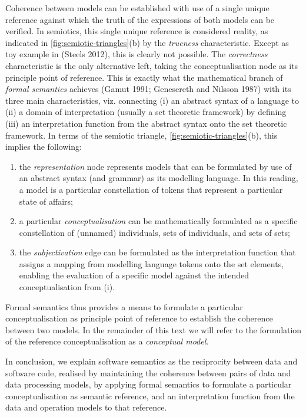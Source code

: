 \documentclass[a4paper,11pt,oneside,oldfontcommands]{memoir}
\theoremstyle{definition}
\theoremstyle{break}		%
\numberwithin{equation}{chapter}
\numberwithin{figure}{chapter}
\begin{document}
Coherence between models can be established with use of a single unique
reference against which the truth of the expressions of both models can
be verified. In semiotics, this single unique reference is considered
reality, as indicated in \cref{fig:semiotic-triangles}(b) by the
\emph{trueness} characteristic. Except as toy example in (Steels 2012),
this is clearly not possible. The \emph{correctness} characteristic is
the only alternative left, taking the conceptualisation node as its
principle point of reference. This is exactly what the mathematical
branch of \emph{formal semantics} achieves (Gamut 1991; Genesereth and
Nilsson 1987) with its three main characteristics, viz. connecting (i)
an abstract syntax of a language to (ii) a domain of interpretation
(usually a set theoretic framework) by defining (iii) an interpretation
function from the abstract syntax onto the set theoretic framework. In
terms of the semiotic triangle, \cref{fig:semiotic-triangles}(b), this
implies the following:

\begin{enumerate}
\def\labelenumi{(\roman{enumi})}
\tightlist
\item
  the \emph{representation} node represents models that can be
  formulated by use of an abstract syntax (and grammar) as its modelling
  language. In this reading, a model is a particular constellation of
  tokens that represent a particular state of affairs;
\item
  a particular \emph{conceptualisation} can be mathematically formulated
  as a specific constellation of (unnamed) individuals, sets of
  individuals, and sets of sets;
\item
  the \emph{subjectivation} edge can be formulated as the interpretation
  function that assigns a mapping from modelling language tokens onto
  the set elements, enabling the evaluation of a specific model against
  the intended conceptualisation from (i).
\end{enumerate}

Formal semantics thus provides a means to formulate a particular
conceptualisation as principle point of reference to establish the
coherence between two models. In the remainder of this text we will
refer to the formulation of the reference conceptualisation as a
\emph{conceptual model}.

In conclusion, we explain software semantics as the reciprocity between
data and software code, realised by maintaining the coherence between
pairs of data and data processing models, by applying formal semantics
to formulate a particular conceptualisation as semantic reference, and
an interpretation function from the data and operation models to that
reference.
\end{document}

